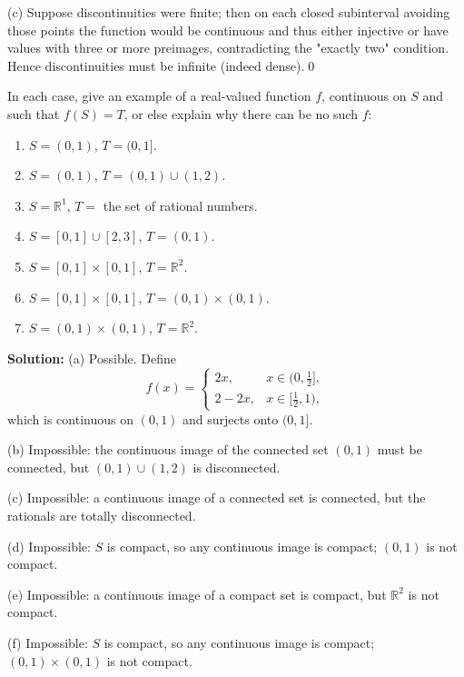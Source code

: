 (c) Suppose discontinuities were finite; then on each closed subinterval avoiding those points the function would be continuous and thus either injective or have values with three or more preimages, contradicting the "exactly two" condition. Hence discontinuities must be infinite (indeed dense).\qed



\begin{problembox}
In each case, give an example of a real-valued function \( f \), continuous on \( S \) and such that \( f(S) = T \), or else explain why there can be no such \( f \):
\begin{enumerate}[label=(\alph*)]
\item \( S = (0, 1) \), \( T = (0, 1] \).
\item \( S = (0, 1) \), \( T = (0, 1) \cup (1, 2) \).
\item \( S = \mathbb{R}^1 \), \( T = \) the set of rational numbers.
\item \( S = [0, 1] \cup [2, 3] \), \( T = (0, 1) \).
\item \( S = [0, 1] \times [0, 1] \), \( T = \mathbb{R}^2 \).
\item \( S = [0, 1] \times [0, 1] \), \( T = (0, 1) \times (0, 1) \).
\item \( S = (0, 1) \times (0, 1) \), \( T = \mathbb{R}^2 \).
\end{enumerate}
\end{problembox}


\noindent\textbf{Solution:}
(a) Possible. Define
\[
f(x)=\begin{cases}
2x,& x\in(0,\tfrac12],\\
2-2x,& x\in[\tfrac12,1),
\end{cases}
\]
which is continuous on $(0,1)$ and surjects onto $(0,1]$.

(b) Impossible: the continuous image of the connected set $(0,1)$ must be connected, but $(0,1)\cup(1,2)$ is disconnected.

(c) Impossible: a continuous image of a connected set is connected, but the rationals are totally disconnected.

(d) Impossible: $S$ is compact, so any continuous image is compact; $(0,1)$ is not compact.

(e) Impossible: a continuous image of a compact set is compact, but $\mathbb{R}^2$ is not compact.

(f) Impossible: $S$ is compact, so any continuous image is compact; $(0,1)\times(0,1)$ is not compact.

